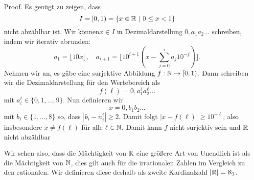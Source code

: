 \begin{emphBox}{}{}
Proof.   Es genügt zu zeigen, dass
\begin{equation*}
I=[0,1) = \{ x \in \mathbb{R}~|~0 \leq x < 1\}
\end{equation*}
nicht abzählbar ist. Wir können\(x \in I\) in Dezimaldarstellung \(0,a_1a_2 \ldots\) schreiben, indem wir iterativ abrunden:
\begin{equation*}
a_1 = \lfloor 10 x \rfloor, \quad a_{i+1} = \lfloor 10^{i+1}(x-\sum_{j=0}^i a_j 10^{-j})\rfloor.
\end{equation*}
Nehmen wir an, es gäbe eine surjektive Abbildung \(f: \mathbb{N} \rightarrow [0,1)\). Dann schreiben wir die Dezimaldarstellung für den Wertebereich als
\begin{equation*}
f(\ell) = 0,a_1^\ell a_2^\ell \ldots
\end{equation*}
mit \(a_i^\ell \in \{0,1,\ldots,9\}\). Nun definieren wir
\begin{equation*}
x=0,b_1 b_2 \ldots
\end{equation*}
mit \(b_i \in \{1,\ldots,8\}\) so, dass \(|b_i - n_i^i| \geq 2\). Damit folgt \(|x-f(\ell)|\geq 10^{-\ell}\), also insbesondere \(x \neq f(\ell)\) für alle \(\ell \in \mathbb{N}\). Damit kann \(f\) nicht surjektiv sein und \(\mathbb{R}\) nicht abzählbar
\end{emphBox}

Wir sehen also, dass die Mächtigkeit von \(\mathbb{R}\) eine größere Art von Unendlich ist als die Mächtigkeit von \(\mathbb{N}\), dies gilt auch für die irrationalen Zahlen im Vergleich zu den rationalen. Wir definieren diese deshalb als zweite Kardinalzahl \(|\mathbb{R}|= \aleph_1\).


